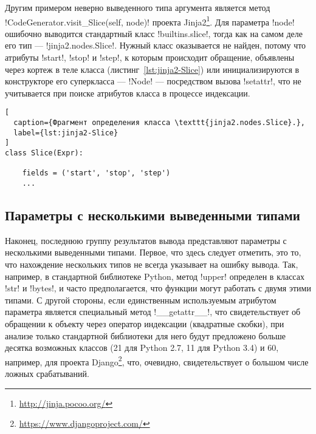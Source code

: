 Другим примером неверно выведенного типа аргумента является метод
!CodeGenerator.visit_Slice(self, node)! проекта
Jinja2\footnote{\url{http://jinja.pocoo.org/}}. Для параметра !node!
ошибочно выводится стандартный класс !builtins.slice!, тогда как на самом деле
его тип --- !jinja2.nodes.Slice!. Нужный класс оказывается не найден, потому что атрибуты
!start!, !stop! и !step!, к которым происходит обращение, объявлены через кортеж
в теле класса (листинг~\ref{lst:jinja2-Slice}) или инициализируются в
конструкторе его суперкласса --- !Node! --- посредством вызова !setattr!, что не
учитывается при поиске атрибутов класса в процессе индексации.

\begin{lstlisting}[
  caption={Фрагмент определения класса \texttt{jinja2.nodes.Slice}.},
  label={lst:jinja2-Slice}
]
class Slice(Expr):

    fields = ('start', 'stop', 'step')
    ...

\end{lstlisting}

\subsection{Параметры с несколькими выведенными типами}
\label{sub:scattered-type-parameters}

Наконец, последнюю группу результатов вывода представляют параметры с
несколькими выведенными типами. Первое, что здесь следует отметить, это то, что
нахождение нескольких типов не всегда указывает на ошибку вывода. Так, например,
в стандартной библиотеке Python, метод !upper! определен в классах !str! и
!bytes!, и часто предполагается, что функции могут работать с двумя этими
типами. С другой стороны, если единственным используемым атрибутом параметра
является специальный метод !__getattr__!, что свидетельствует об обращении к
объекту через оператор индексации (квадратные скобки), при анализе только
стандартной библиотеки для него будут предложено больше десятка возможных
классов (21 для Python 2.7, 11 для Python 3.4) и 60, например, для проекта
Django\footnote{\url{https://www.djangoproject.com/}}, что, очевидно,
свидетельствует о большом числе ложных срабатываний. 

